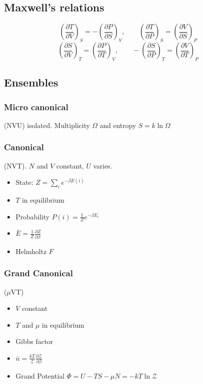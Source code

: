 \documentclass[a4paper,norsk, 10pt]{article}
\newcommand{\pd}[3]{\left(\frac{\partial #1}{\partial #2}\right)_{#3}}
\begin{document}
\subsection{Maxwell's relations}
\begin{equation}
\pd{T}{V}{S} = -\pd{P}{S}{V}, \qquad \pd{T}{P}{S} = \pd{V}{S}{P}
\end{equation}
\begin{equation}
\pd{S}{V}{T} = \pd{P}{T}{V}, \qquad -\pd{S}{P}{T} = \pd{V}{T}{P}
\end{equation}
\subsection{Ensembles}
\subsubsection{Micro canonical}
(NVU) isolated. Multiplicity $\Omega$ and entropy $S = k\ln\Omega$
\subsubsection{Canonical}
(NVT). $N$ and $V$ constant, $U$ varies.
\begin{itemize}
\item State: $Z = \sum_i e^{-\beta E(i)}$
\item $T$ in equilibrium
\item Probability $P(i) = \frac{1}{Z}e^{-\beta E_i}$
\item $\bar{E} = \frac{1}{Z}\frac{\partial Z}{\partial \beta}$
\item Helmholtz $F$
\end{itemize}
\subsubsection{Grand Canonical}
($\mu$VT)
\begin{itemize}
\item $V$ constant
\item $T$ and $\mu$ in equilibrium
\item Gibbs factor
\item $\bar{n} = \frac{kT}{\mathcal{Z}}\frac{\partial \mathcal{Z}}{\partial \beta}$
\item Grand Potential $\Phi = U - TS - \mu N = -kT\ln \mathcal{Z}$
\end{itemize}
\end{document}
